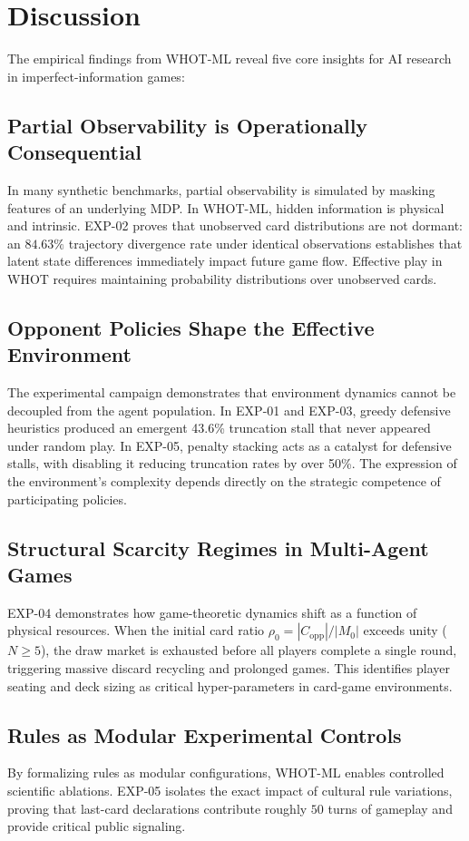 \documentclass[11pt]{article}
\begin{document}
\section{Discussion}

The empirical findings from WHOT-ML reveal five core insights for AI research in imperfect-information games:

\subsection{Partial Observability is Operationally Consequential}
In many synthetic benchmarks, partial observability is simulated by masking features of an underlying MDP. In WHOT-ML, hidden information is physical and intrinsic. EXP-02 proves that unobserved card distributions are not dormant: an $84.63\%$ trajectory divergence rate under identical observations establishes that latent state differences immediately impact future game flow. Effective play in WHOT requires maintaining probability distributions over unobserved cards.

\subsection{Opponent Policies Shape the Effective Environment}
The experimental campaign demonstrates that environment dynamics cannot be decoupled from the agent population. In EXP-01 and EXP-03, greedy defensive heuristics produced an emergent 43.6\% truncation stall that never appeared under random play. In EXP-05, penalty stacking acts as a catalyst for defensive stalls, with disabling it reducing truncation rates by over 50\%. The expression of the environment's complexity depends directly on the strategic competence of participating policies.

\subsection{Structural Scarcity Regimes in Multi-Agent Games}
EXP-04 demonstrates how game-theoretic dynamics shift as a function of physical resources. When the initial card ratio $\rho_0 = |C_{\text{opp}}| / |M_0|$ exceeds unity ($N \ge 5$), the draw market is exhausted before all players complete a single round, triggering massive discard recycling and prolonged games. This identifies player seating and deck sizing as critical hyper-parameters in card-game environments.

\subsection{Rules as Modular Experimental Controls}
By formalizing rules as modular configurations, WHOT-ML enables controlled scientific ablations. EXP-05 isolates the exact impact of cultural rule variations, proving that last-card declarations contribute roughly $50$ turns of gameplay and provide critical public signaling.
\end{document}
